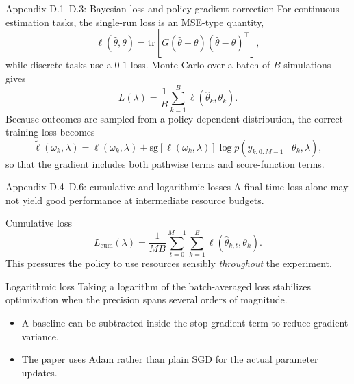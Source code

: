 \documentclass[aspectratio=169]{beamer}
\begin{document}
\begin{frame}{Appendix D.1--D.3: Bayesian loss and policy-gradient correction}
For continuous estimation tasks, the single-run loss is an MSE-type quantity,
\[
  \ell(\hat\theta,\theta)=\mathrm{tr}\!\left[G(\hat\theta-\theta)(\hat\theta-\theta)^\top\right],
\]
while discrete tasks use a $0$-$1$ loss.
\vspace{0.4em}
Monte Carlo over a batch of $B$ simulations gives
\[
  L(\lambda)=\frac{1}{B}\sum_{k=1}^B \ell(\hat\theta_k,\theta_k).
\]
Because outcomes are sampled from a policy-dependent distribution, the correct training loss becomes
\[
  \tilde\ell(\omega_k,\lambda)=\ell(\omega_k,\lambda)
  +\mathrm{sg}[\ell(\omega_k,\lambda)]\log p(y_{k,0:M-1}\mid\theta_k,\lambda),
\]
so that the gradient includes both pathwise terms and score-function terms.
\end{frame}

\begin{frame}{Appendix D.4--D.6: cumulative and logarithmic losses}
A final-time loss alone may not yield good performance at intermediate resource budgets.
\vspace{0.5em}
\begin{block}{Cumulative loss}
\[
  L_{\mathrm{cum}}(\lambda)=\frac{1}{MB}\sum_{t=0}^{M-1}\sum_{k=1}^B
  \ell(\hat\theta_{k,t},\theta_k).
\]
This pressures the policy to use resources sensibly \emph{throughout} the experiment.
\end{block}
\begin{block}{Logarithmic loss}
Taking a logarithm of the batch-averaged loss stabilizes optimization when the precision spans several orders of magnitude.
\end{block}
\begin{itemize}
  \item A baseline can be subtracted inside the stop-gradient term to reduce gradient variance.
  \item The paper uses Adam rather than plain SGD for the actual parameter updates.
\end{itemize}
\end{frame}
\end{document}
